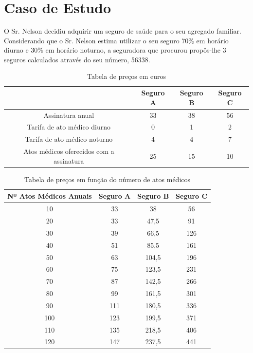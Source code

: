 \documentclass[11pt,a4paper,titlepage]{article}
\begin{document}
\section{Caso de Estudo}
O Sr. Nelson decidiu adquirir um seguro de saúde para o seu agregado familiar.\\
Considerando que o Sr. Nelson estima utilizar o seu seguro 70\% em horário diurno e 30\% em horário noturno, a seguradora que procurou propôs-lhe 3 seguros calculados através do seu número, 56338.
\begin{table}[htbp]
  \centering
    \begin{tabular}{|c|c|c|c|}
    \toprule
     & \multicolumn{1}{p{4.215em}|}{Seguro A} & \multicolumn{1}{p{4.215em}|}{Seguro B} & \multicolumn{1}{p{4.215em}|}{Seguro C} \\
    \midrule
    Assinatura anual & 33 & 38 & 56 \\
    \midrule
    Tarifa de ato médico diurno & 0 & 1 & 2 \\
    \midrule
    Tarifa de ato médico noturno & 4 & 4 & 7 \\
    \midrule
    Atos médicos oferecidos com a assinatura & 25 & 15 & 10 \\
    \bottomrule
    \end{tabular}
  \caption{Tabela de preços em euros}
  \label{tab1}
\end{table}
\begin{table}[htbp]
  \centering
    \begin{tabular}{|c|c|c|c|}
    \toprule
    Nº Atos Médicos Anuais & Seguro A & Seguro B & Seguro C \\
    \midrule
    10    & 33    & 38    & 56 \\
    \midrule
    20    & 33    & 47,5  & 91 \\
    \midrule
    30    & 39    & 66,5  & 126 \\
    \midrule
    40    & 51    & 85,5  & 161 \\
    \midrule
    50    & 63    & 104,5 & 196 \\
    \midrule
    60    & 75    & 123,5 & 231 \\
    \midrule
    70    & 87    & 142,5 & 266 \\
    \midrule
    80    & 99    & 161,5 & 301 \\
    \midrule
    90    & 111   & 180,5 & 336 \\
    \midrule
    100   & 123   & 199,5 & 371 \\
    \midrule
    110   & 135   & 218,5 & 406 \\
    \midrule
    120   & 147   & 237,5 & 441 \\
    \bottomrule
    \end{tabular}
  \caption{Tabela de preços em função do número de atos médicos}
  \label{tab2}
\end{table}
\end{document}
